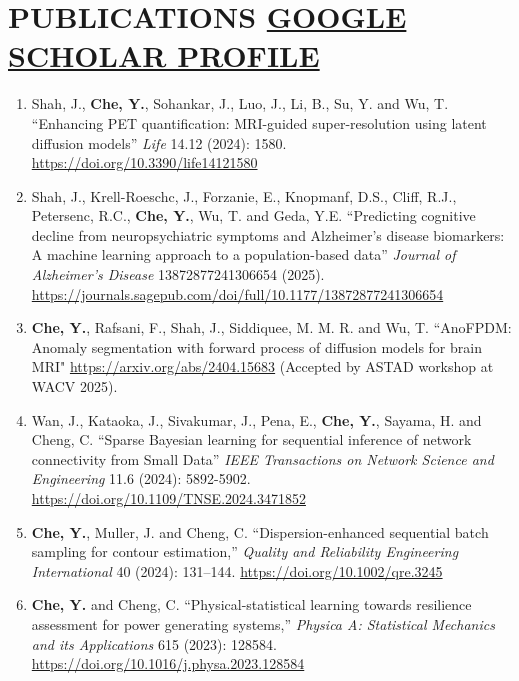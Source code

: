 \documentclass[10pt]{article}
\begin{document}
\vspace{-2em}
\section*{PUBLICATIONS \hfill\hfill\hfill\hfill \href{https://scholar.google.com/citations?user=3Z6Z9ZkAAAAJ&hl=en}{GOOGLE SCHOLAR PROFILE}} 
\vspace{-0.5em}
\begin{enumerate}
	\setlength\itemsep{0.5pt}
	\item Shah, J., {\bf Che, Y.}, Sohankar, J., Luo, J., Li, B., Su, Y. and Wu, T. ``Enhancing PET quantification: MRI-guided super-resolution using latent diffusion models'' \textit{Life} 14.12 (2024): 1580. \url{https://doi.org/10.3390/life14121580}
	
	\item Shah, J., Krell-Roeschc, J., Forzanie, E., Knopmanf, D.S., Cliff, R.J., Petersenc, R.C., {\bf Che, Y.}, Wu, T. and Geda, Y.E. ``Predicting cognitive decline from neuropsychiatric symptoms and Alzheimer’s disease biomarkers: A machine learning approach to a population-based data'' \textit{Journal of Alzheimer's Disease} 13872877241306654 (2025). \url{https://journals.sagepub.com/doi/full/10.1177/13872877241306654}
	
	\item {\bf Che, Y.}, Rafsani, F., Shah, J., Siddiquee, M. M. R. and Wu, T. ``AnoFPDM: Anomaly segmentation with forward process of diffusion models for brain MRI" \url{https://arxiv.org/abs/2404.15683} (Accepted by ASTAD workshop at WACV 2025).

	\item Wan, J., Kataoka, J., Sivakumar, J., Pena, E., {\bf Che, Y.}, Sayama, H. and Cheng, C. ``Sparse Bayesian learning for sequential inference of network connectivity from Small Data'' \textit{IEEE Transactions on Network Science and Engineering} 11.6 (2024): 5892-5902. \url{https://doi.org/10.1109/TNSE.2024.3471852}
	
	\item {\bf Che, Y.}, Muller, J. and Cheng, C. ``Dispersion-enhanced sequential batch sampling for contour estimation,'' \textit{Quality and Reliability Engineering International} 40 (2024): 131–144. \url{https://doi.org/10.1002/qre.3245} 

	\item {\bf Che, Y.} and Cheng, C. ``Physical-statistical learning towards resilience assessment for power generating systems,'' \textit{Physica A: Statistical Mechanics and its Applications} 615 (2023): 128584. \url{https://doi.org/10.1016/j.physa.2023.128584}


\end{enumerate}
\end{document}
